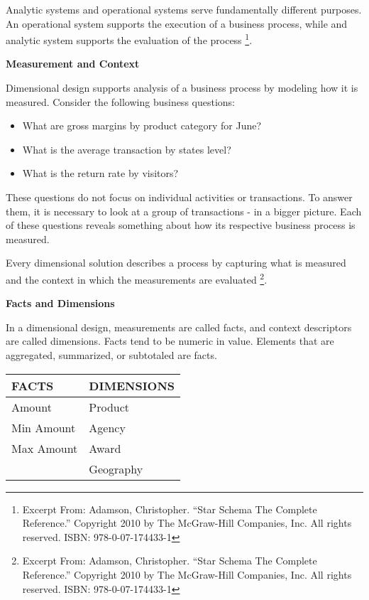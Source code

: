 \documentclass[letterpaper,12pt,oneside]{sphinxmanual}
\begin{document}
Analytic systems and operational systems serve fundamentally different purposes.
An operational system supports the execution of a business process, while and
analytic system supports the evaluation of the process \footnote[7]{\sphinxAtStartFootnote%
Excerpt From: Adamson, Christopher. “Star Schema The Complete Reference.” Copyright 2010 by The McGraw-Hill Companies, Inc. All rights reserved. ISBN: 978-0-07-174433-1
}.

\textbf{Measurement and Context}

Dimensional design supports analysis of a business process by modeling how it is
measured. Consider the following business questions:
\begin{itemize}
\item {} 
What are gross margins by product category for June?

\item {} 
What is the average transaction by states level?

\item {} 
What is the return rate by visitors?

\end{itemize}

These questions do not focus on individual activities or transactions.
To answer them, it is necessary to look at a group of transactions - in a bigger picture.
Each of these questions reveals something about how its respective business process is measured.

Every dimensional solution describes a process by capturing what is measured and the context in which the measurements are evaluated \footnote[8]{\sphinxAtStartFootnote%
Excerpt From: Adamson, Christopher. “Star Schema The Complete Reference.” Copyright 2010 by The McGraw-Hill Companies, Inc. All rights reserved. ISBN: 978-0-07-174433-1
}.

\textbf{Facts and Dimensions}

In a dimensional design, measurements are called facts, and context descriptors are called dimensions.
Facts tend to be numeric in value. Elements that are aggregated, summarized, or subtotaled are facts.

\begin{tabulary}{\linewidth}{|L|L|}
\hline

\textbf{FACTS}
 & 
\textbf{DIMENSIONS}
\\
\hline
Amount
 & 
Product
\\
\hline
Min Amount
 & 
Agency
\\
\hline
Max Amount
 & 
Award
\\
\hline & 
Geography
\\
\hline\end{tabulary}
\end{document}
